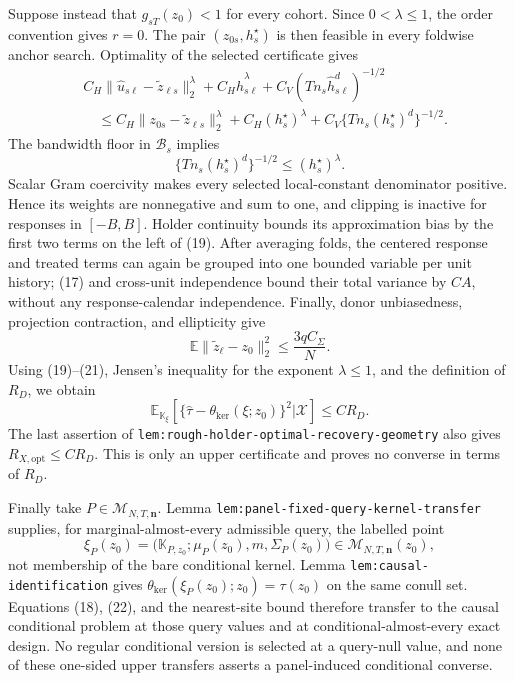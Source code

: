 Suppose instead that \(g_{sT}(z_0)<1\) for every cohort.  Since \(0<\lambda\le1\), the order convention gives \(r=0\).  The pair \((z_{0s},h_s^\star)\) is then feasible in every foldwise anchor search.  Optimality of the selected certificate gives
\[
\begin{aligned}
 &C_H\|\widehat u_{s\ell}-\widetilde z_{\ell s}\|_2^\lambda
 +C_H\widehat h_{s\ell}^\lambda
 +C_V(Tn_s\widehat h_{s\ell}^d)^{-1/2}\\
 &\quad\le C_H\|z_{0s}-\widetilde z_{\ell s}\|_2^\lambda
 +C_H(h_s^\star)^\lambda
 +C_V\{Tn_s(h_s^\star)^d\}^{-1/2}.
\end{aligned}                                               \tag{19}
\]
The bandwidth floor in \(\mathcal B_s\) implies
\[
 \{Tn_s(h_s^\star)^d\}^{-1/2}\le(h_s^\star)^\lambda.      \tag{20}
\]
Scalar Gram coercivity makes every selected local-constant denominator positive.  Hence its weights are nonnegative and sum to one, and clipping is inactive for responses in \([-B,B]\).  Holder continuity bounds its approximation bias by the first two terms on the left of (19).  After averaging folds, the centered response and treated terms can again be grouped into one bounded variable per unit history; (17) and cross-unit independence bound their total variance by \(CA\), without any response-calendar independence.  Finally, donor unbiasedness, projection contraction, and ellipticity give
\[
 \mathbb E\|\widetilde z_\ell-z_0\|_2^2
 \le\frac{3qC_\Sigma}{N}.                                  \tag{21}
\]
Using (19)--(21), Jensen's inequality for the exponent \(\lambda\le1\), and the definition of \(R_D\), we obtain
\[
 \mathbb E_{\mathbb K_\xi}\!\left[
 \{\widehat\tau-\theta_{\mathrm{ker}}(\xi;z_0)\}^2
 \mathrel{\Big|}\mathcal X\right]\le CR_D.               \tag{22}
\]
The last assertion of \texttt{lem:rough-holder-optimal-recovery-geometry} also gives \(R_{X,\mathrm{opt}}\le CR_D\).  This is only an upper certificate and proves no converse in terms of \(R_D\).

Finally take \(P\in\mathcal M_{N,T,\mathbf n}\).  Lemma \texttt{lem:panel-fixed-query-kernel-transfer} supplies, for marginal-almost-every admissible query, the labelled point
\[
 \xi_P(z_0)=\bigl(\mathbb K_{P,z_0};\mu_P(z_0),m,
 \Sigma_P(z_0)\bigr)\in\mathcal M_{N,T,\mathbf n}(z_0),    \tag{23}
\]
not membership of the bare conditional kernel.  Lemma \texttt{lem:causal-identification} gives
\(\theta_{\mathrm{ker}}(\xi_P(z_0);z_0)=\tau(z_0)\) on the same conull set.  Equations (18), (22), and the nearest-site bound therefore transfer to the causal conditional problem at those query values and at conditional-almost-every exact design.  No regular conditional version is selected at a query-null value, and none of these one-sided upper transfers asserts a panel-induced conditional converse.

